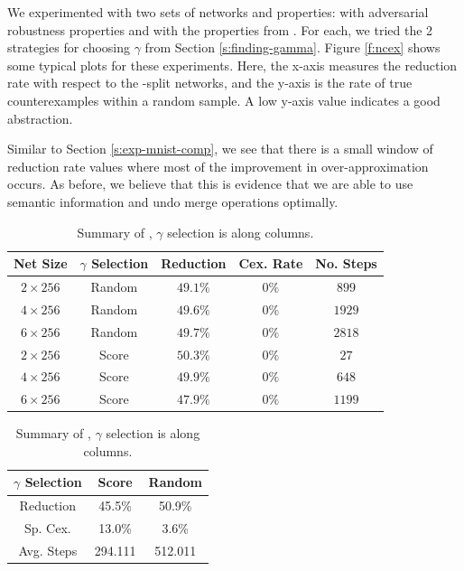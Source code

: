 We experimented with two sets of networks and properties: \mnist with
adversarial robustness properties and \acasxu with the properties from
\cite{reluplex}. For each, we tried the 2 strategies for choosing $\gamma$ from
Section \ref{s:finding-gamma}.
Figure \ref{f:ncex} shows some typical plots
for these experiments. Here, the x-axis measures the reduction rate with respect
to the \inc-\dec split networks, and the y-axis is the rate of true
counterexamples within a random sample. A low y-axis value indicates a good
abstraction.

Similar to Section \ref{s:exp-mnist-comp}, we see that there is a small window
of reduction rate values where most of the improvement in over-approximation
occurs. As before, we believe that this is evidence that we are able to use
semantic information and undo merge operations optimally.

\begin{table}
\parbox{0.60\textwidth}{
\begin{tabular}{|c|c|c|c|c|}
    \hline
    Net Size     & $\gamma$ Selection  & Reduction & Cex. Rate & No. Steps \\
    \hline
    $2\times256$ & Random              & $49.1\%$  & $  0\%$  & $ 899$    \\
    $4\times256$ & Random              & $49.6\%$  & $  0\%$  & $1929$    \\
    $6\times256$ & Random              & $49.7\%$  & $  0\%$  & $2818$    \\
    $2\times256$ & Score               & $50.3\%$  & $  0\%$  & $  27$    \\
    $4\times256$ & Score               & $49.9\%$  & $  0\%$  & $ 648$    \\
    $6\times256$ & Score               & $47.9\%$  & $  0\%$  & $1199$    \\
    \hline
\end{tabular}
\caption{Summary of \mnist Results on a single robustness property }
\label{t:mnist-prop-summary}
}
\quad
\parbox{0.30\textwidth}{
\begin{tabular}{|c|cc|}
\hline
$\gamma$ Selection  & Score   & Random  \\
\hline
Reduction  & 45.5\%  & 50.9\%  \\
Sp. Cex.   & 13.0\%  & 3.6\%   \\
Avg. Steps & 294.111 & 512.011 \\
\hline
\end{tabular}
\caption{Summary of \acasxu, $\gamma$ selection is along columns.}
\label{t:acas-ncex}
}
\vspace{-1cm}
\end{table}

